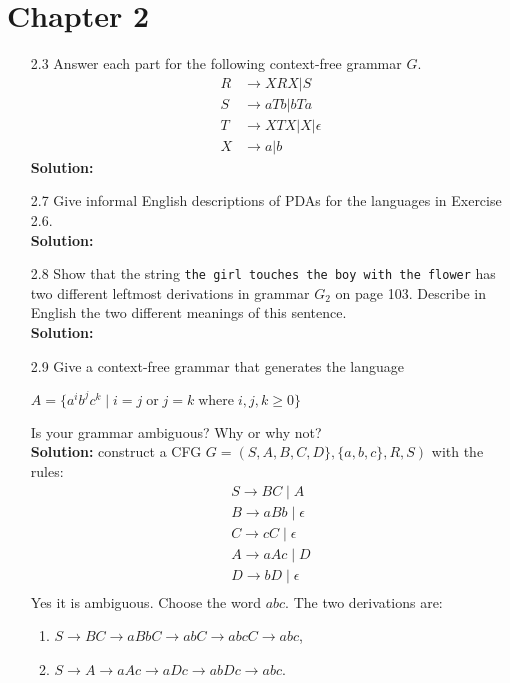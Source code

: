 \section{Chapter 2}

\begin{enumerate}
\item[2.3]Answer each part for the following context-free grammar $G$.
\begin{align*}
R &\rightarrow XRX | S \\
S &\rightarrow aTb | bTa \\
T &\rightarrow XTX | X | \epsilon \\
X &\rightarrow a | b
\end{align*}
\textbf{Solution:} \alreadyanswered

\item[2.7]Give informal English descriptions of PDAs for the languages in Exercise 2.6.
\\
\textbf{Solution:} \alreadyanswered

\item[2.8]Show that the string \verb|the girl touches the boy with the flower| has two different leftmost derivations in grammar $G_2$ on page 103. Describe in English the two different meanings of this sentence.
\\
\textbf{Solution:} \alreadyanswered

\item[2.9]Give a context-free grammar that generates the language
\begin{center}
$A = \{a^ib^jc^k\;\vert\;i=j\;\text{or}\;j=k\;\text{where}\;i,j,k\ge 0\}$
\end{center}
Is your grammar ambiguous? Why or why not?
\\
\textbf{Solution:} construct a CFG $G = (S, A, B, C, D\}, \{a, b, c\}, R, S)$ with the rules:
\begin{align*}
S \rightarrow BC\;\vert\;A\\
B \rightarrow aBb\;\vert\;\epsilon \\
C \rightarrow cC\;\vert\;\epsilon \\
A \rightarrow aAc\;\vert\;D \\
D \rightarrow bD\;\vert\;\epsilon \\
\end{align*}
Yes it is ambiguous. Choose the word $abc$. The two derivations are:
\begin{enumerate}
\item $S \rightarrow BC \rightarrow aBbC \rightarrow abC \rightarrow abcC \rightarrow abc$,
\item $S \rightarrow A \rightarrow aAc \rightarrow aDc \rightarrow abDc \rightarrow abc$.
\end{enumerate}


\end{enumerate}
